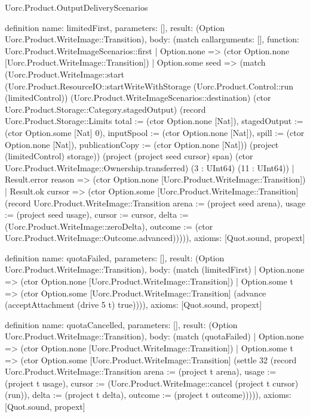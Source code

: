 \begin{lexlean}{Uorc.Product.OutputDeliveryScenarios}
\begin{semanticmodule}
definition{
  name: limitedFirst,
  parameters: [],
  result: (Option Uorc.Product.WriteImage::Transition),
  body: (match call{arguments: [], function: Uorc.Product.WriteImageScenarios::first}
    | Option.none => (ctor Option.none [Uorc.Product.WriteImage::Transition])
    | Option.some seed => (match (Uorc.Product.WriteImage::start (Uorc.Product.ResourceIO::startWriteWithStorage (Uorc.Product.Control::run (limitedControl)) (Uorc.Product.WriteImageScenarios::destination) (ctor Uorc.Product.Storage::Category.stagedOutput) (record Uorc.Product.Storage::Limits {total := (ctor Option.none [Nat]), stagedOutput := (ctor Option.some [Nat] 0), inputSpool := (ctor Option.none [Nat]), spill := (ctor Option.none [Nat]), publicationCopy := (ctor Option.none [Nat])}) (project (limitedControl) storage)) (project (project seed cursor) span) (ctor Uorc.Product.WriteImage::Ownership.transferred) (3 : UInt64) (11 : UInt64))
      | Result.error reason => (ctor Option.none [Uorc.Product.WriteImage::Transition])
      | Result.ok cursor => (ctor Option.some [Uorc.Product.WriteImage::Transition] (record Uorc.Product.WriteImage::Transition {arena := (project seed arena), usage := (project seed usage), cursor := cursor, delta := (Uorc.Product.WriteImage::zeroDelta), outcome := (ctor Uorc.Product.WriteImage::Outcome.advanced)})))),
  axioms: [Quot.sound, propext]
}

definition{
  name: quotaFailed,
  parameters: [],
  result: (Option Uorc.Product.WriteImage::Transition),
  body: (match (limitedFirst)
    | Option.none => (ctor Option.none [Uorc.Product.WriteImage::Transition])
    | Option.some t => (ctor Option.some [Uorc.Product.WriteImage::Transition] (advance (acceptAttachment (drive 5 t) true)))),
  axioms: [Quot.sound, propext]
}

definition{
  name: quotaCancelled,
  parameters: [],
  result: (Option Uorc.Product.WriteImage::Transition),
  body: (match (quotaFailed)
    | Option.none => (ctor Option.none [Uorc.Product.WriteImage::Transition])
    | Option.some t => (ctor Option.some [Uorc.Product.WriteImage::Transition] (settle 32 (record Uorc.Product.WriteImage::Transition {arena := (project t arena), usage := (project t usage), cursor := (Uorc.Product.WriteImage::cancel (project t cursor) (run)), delta := (project t delta), outcome := (project t outcome)})))),
  axioms: [Quot.sound, propext]
}


\end{semanticmodule}
\end{lexlean}
